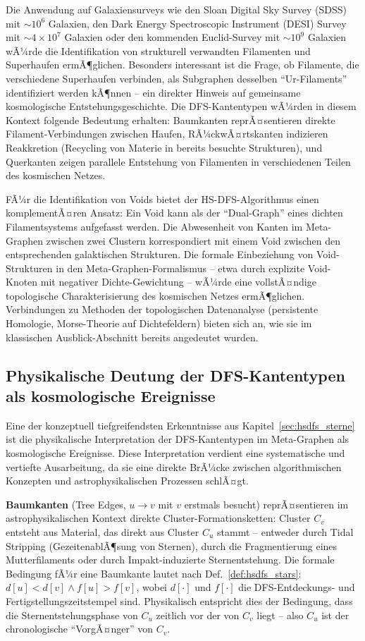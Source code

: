 ﻿\documentclass[a4paper,12pt]{report}
\theoremstyle{definition}
\begin{document}
Die Anwendung auf Galaxiensurveys wie den Sloan Digital Sky Survey (SDSS) mit $\sim 10^6$ Galaxien, den Dark Energy Spectroscopic Instrument (DESI) Survey mit $\sim 4 \times 10^7$ Galaxien oder den kommenden Euclid-Survey mit $\sim 10^9$ Galaxien wÃ¼rde die Identifikation von strukturell verwandten Filamenten und Superhaufen ermÃ¶glichen. Besonders interessant ist die Frage, ob Filamente, die verschiedene Superhaufen verbinden, als Subgraphen desselben ``Ur-Filaments'' identifiziert werden kÃ¶nnen -- ein direkter Hinweis auf gemeinsame kosmologische Entstehungsgeschichte. Die DFS-Kantentypen wÃ¼rden in diesem Kontext folgende Bedeutung erhalten: Baumkanten reprÃ¤sentieren direkte Filament-Verbindungen zwischen Haufen, RÃ¼ckwÃ¤rtskanten indizieren Reakkretion (Recycling von Materie in bereits besuchte Strukturen), und Querkanten zeigen parallele Entstehung von Filamenten in verschiedenen Teilen des kosmischen Netzes.

FÃ¼r die Identifikation von Voids bietet der HS-DFS-Algorithmus einen komplementÃ¤ren Ansatz: Ein Void kann als der ``Dual-Graph'' eines dichten Filamentsystems aufgefasst werden. Die Abwesenheit von Kanten im Meta-Graphen zwischen zwei Clustern korrespondiert mit einem Void zwischen den entsprechenden galaktischen Strukturen. Die formale Einbeziehung von Void-Strukturen in den Meta-Graphen-Formalismus -- etwa durch explizite Void-Knoten mit negativer Dichte-Gewichtung -- wÃ¼rde eine vollstÃ¤ndige topologische Charakterisierung des kosmischen Netzes ermÃ¶glichen. Verbindungen zu Methoden der topologischen Datenanalyse (persistente Homologie, Morse-Theorie auf Dichtefeldern) bieten sich an, wie sie im klassischen Ausblick-Abschnitt bereits angedeutet wurden.

\subsection{Physikalische Deutung der DFS-Kantentypen als kosmologische Ereignisse}

Eine der konzeptuell tiefgreifendsten Erkenntnisse aus Kapitel~\ref{sec:hsdfs_sterne} ist die physikalische Interpretation der DFS-Kantentypen im Meta-Graphen als kosmologische Ereignisse. Diese Interpretation verdient eine systematische und vertiefte Ausarbeitung, da sie eine direkte BrÃ¼cke zwischen algorithmischen Konzepten und astrophysikalischen Prozessen schlÃ¤gt.

\textbf{Baumkanten} (Tree Edges, $u \to v$ mit $v$ erstmals besucht) reprÃ¤sentieren im astrophysikalischen Kontext direkte Cluster-Formationsketten: Cluster $C_v$ entsteht aus Material, das direkt aus Cluster $C_u$ stammt -- entweder durch Tidal Stripping (GezeitenablÃ¶sung von Sternen), durch die Fragmentierung eines Mutterfilaments oder durch Impakt-induzierte Sternentstehung. Die formale Bedingung fÃ¼r eine Baumkante lautet nach Def.~\ref{def:hsdfs_stars}: $d[u] < d[v] \wedge f[u] > f[v]$, wobei $d[\cdot]$ und $f[\cdot]$ die DFS-Entdeckungs- und Fertigstellungszeitstempel sind. Physikalisch entspricht dies der Bedingung, dass die Sternentstehungsphase von $C_u$ zeitlich vor der von $C_v$ liegt -- also $C_u$ ist der chronologische ``VorgÃ¤nger'' von $C_v$.
\end{document}
